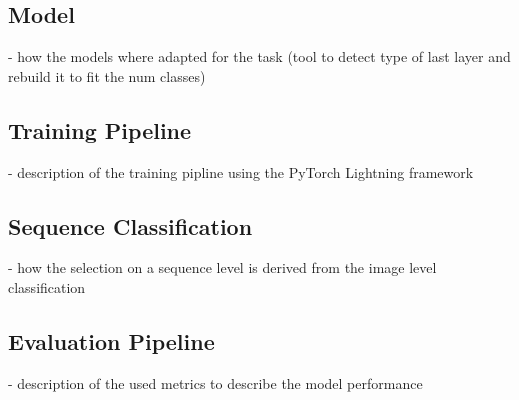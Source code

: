     \subsection{Model}
    - how the models where adapted for the task (tool to detect type of last layer and rebuild it to fit the num classes)

    \subsection{Training Pipeline}
    - description of the training pipline using the PyTorch Lightning framework

    \subsection{Sequence Classification}
    - how the selection on a sequence level is derived from the image level classification

    \subsection{Evaluation Pipeline}
    - description of the used metrics to describe the model performance
